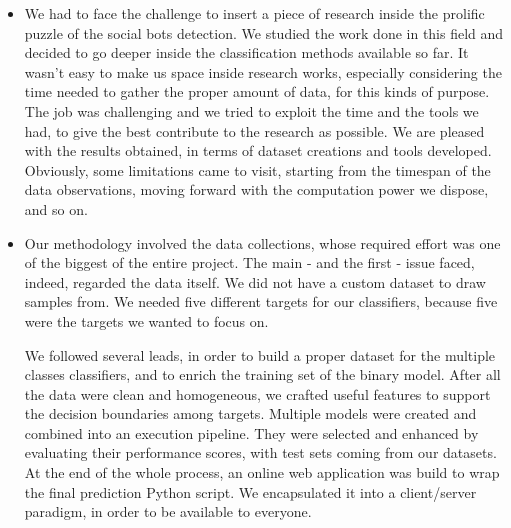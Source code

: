 \begin{itemize}
\item[\PencilRight] We had to face the challenge to insert a piece of research inside the prolific puzzle of the social bots detection. We studied the work done in this field and decided to go deeper inside the classification methods available so far. It wasn't easy to make us space inside research works, especially considering the time needed to gather the proper amount of data, for this kinds of purpose. The job was challenging and we tried to exploit the time and the tools we had, to give the best contribute to the research as possible. We are pleased with the results obtained, in terms of dataset creations and tools developed. Obviously, some limitations came to visit, starting from the timespan of the data observations, moving forward with the computation power we dispose, and so on.
\item[\PencilRight] Our methodology involved the data collections, whose required effort was one of the biggest of the entire project. The main - and the first - issue faced, indeed, regarded the data itself. We did not have a custom dataset to draw samples from. We needed five different targets for our classifiers, because five were the targets we wanted to focus on. 

We followed several leads, in order to build a proper dataset for the multiple classes classifiers, and to enrich the training set of the binary model. After all the data were clean and homogeneous, we crafted useful features to support the decision boundaries among targets. Multiple models were created and combined into an execution pipeline. They were selected and enhanced by evaluating their performance scores, with test sets coming from our datasets. 
At the end of the whole process, an online web application was build to wrap the final prediction Python script. We encapsulated it into a client/server paradigm, in order to be available to everyone.


\end{itemize}
